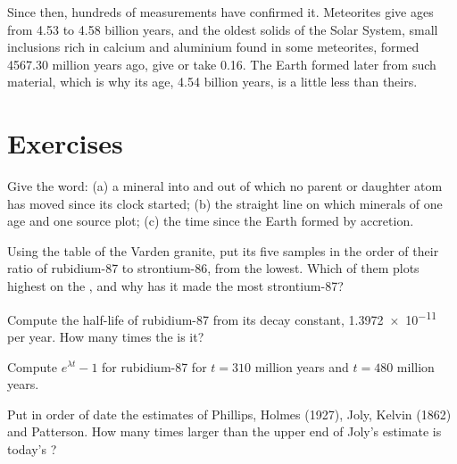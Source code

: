 Since then, hundreds of measurements have confirmed it. Meteorites give ages
from 4.53 to 4.58 billion years, and the oldest solids of the Solar System,
small inclusions rich in calcium and aluminium found in some meteorites,
formed \num{4567.30} million years ago, give or take 0.16. The Earth formed
later from such material, which is why its age, 4.54 billion years, is a
little less than theirs.

\section{Exercises}

\begin{exercise}[$\star$]\label{exo:g12:age-of-the-earth:1}
Give the word: (a) a mineral into and out of which no parent or daughter atom
has moved since its clock started; (b) the straight line on which minerals of
one age and one source plot; (c) the time since the Earth formed by
accretion.
\end{exercise}

\begin{exercise}[$\star$]\label{exo:g12:age-of-the-earth:2}
Using the table of the Varden granite, put its five samples in the order of
their ratio of rubidium-87 to strontium-86, from the lowest. Which of them
plots highest on the , and why has it made the most strontium-87?
\end{exercise}

\begin{exercise}[$\star$]\label{exo:g12:age-of-the-earth:3}
Compute the half-life of rubidium-87 from its decay constant,
\num{1.3972e-11} per year. How many times the  is it?
\end{exercise}

\begin{exercise}[$\star$]\label{exo:g12:age-of-the-earth:4}
Compute $e^{\lambda t} - 1$ for rubidium-87 for $t = 310$ million years and
$t = 480$ million years.
\end{exercise}

\begin{exercise}[$\star$]\label{exo:g12:age-of-the-earth:5}
Put in order of date the estimates of Phillips, Holmes (1927), Joly, Kelvin
(1862) and Patterson. How many times larger than the upper end of Joly's
estimate is today's ?
\end{exercise}

